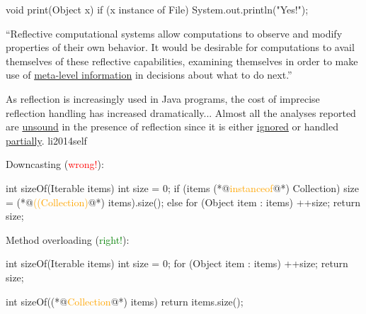 \documentclass{article}
\begin{document}

\pptToc


\begin{multicols}{2}
{\small\begin{ffcode}
void print(Object x) {
  if (x instance of File) {
    System.out.println("Yes!");
  }
}
\end{ffcode}
}
\par\columnbreak\par
``Reflective computational systems allow computations to observe and
modify properties of their own behavior. It would be desirable for computations to avail themselves of these
reflective capabilities, examining themselves in order to make use of
\ul{meta-level information} in decisions about what to do next.''
\end{multicols}
\par
\plush{}

  {As reflection is increasingly used in Java programs, the cost of imprecise reflection handling has increased dramatically... Almost all the analyses reported are \ul{unsound} in the presence of reflection since it is either \ul{ignored} or handled \ul{partially}.}
  {li2014self}


\begin{pptWide}{2}
Downcasting (\textcolor{red}{wrong!}):\par
{\small\begin{ffcode}
int sizeOf(Iterable items) {
  int size = 0;
  if (items (*@\textcolor{orange}{instanceof}@*) Collection) {
    size = (*@\textcolor{orange}{((Collection)}@*) items).size();
  } else {
    for (Object item : items) {
      ++size;
    }
  }
  return size;
}
\end{ffcode}
}
\par\columnbreak\par
Method overloading (\textcolor{green}{right!}):\par
{\small\begin{ffcode}
int sizeOf(Iterable items) {
  int size = 0;
  for (Object item : items) {
    ++size;
  }
  return size;
}

int sizeOf((*@\textcolor{orange}{Collection}@*) items) {
  return items.size();
}
\end{ffcode}
}
\end{pptWide}
\par
\plush{}
\end{document}
